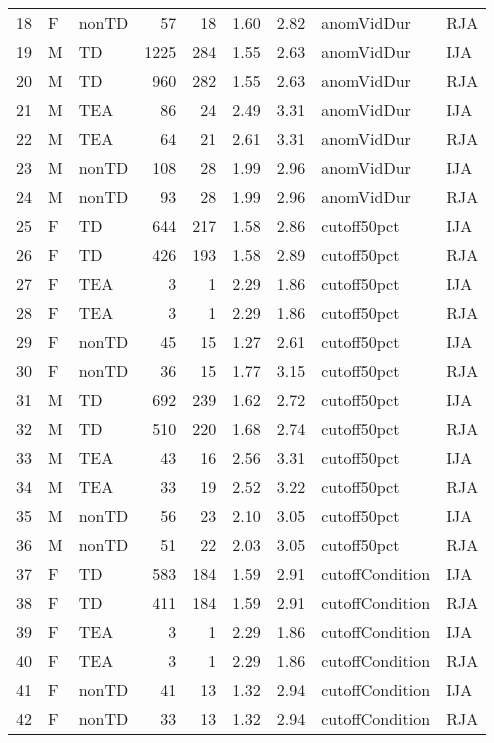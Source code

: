 \documentclass{article}
\begin{document}
\begin{table}[ht]
\begin{tabular}{rllrrrrll}
    18 & F & nonTD &  57 &  18 & 1.60 & 2.82 & anomVidDur & RJA \\ 
    19 & M & TD & 1225 & 284 & 1.55 & 2.63 & anomVidDur & IJA \\ 
    20 & M & TD & 960 & 282 & 1.55 & 2.63 & anomVidDur & RJA \\ 
    21 & M & TEA &  86 &  24 & 2.49 & 3.31 & anomVidDur & IJA \\ 
    22 & M & TEA &  64 &  21 & 2.61 & 3.31 & anomVidDur & RJA \\ 
    23 & M & nonTD & 108 &  28 & 1.99 & 2.96 & anomVidDur & IJA \\ 
    24 & M & nonTD &  93 &  28 & 1.99 & 2.96 & anomVidDur & RJA \\ 
    25 & F & TD & 644 & 217 & 1.58 & 2.86 & cutoff50pct & IJA \\ 
    26 & F & TD & 426 & 193 & 1.58 & 2.89 & cutoff50pct & RJA \\ 
    27 & F & TEA &   3 &   1 & 2.29 & 1.86 & cutoff50pct & IJA \\ 
    28 & F & TEA &   3 &   1 & 2.29 & 1.86 & cutoff50pct & RJA \\ 
    29 & F & nonTD &  45 &  15 & 1.27 & 2.61 & cutoff50pct & IJA \\ 
    30 & F & nonTD &  36 &  15 & 1.77 & 3.15 & cutoff50pct & RJA \\ 
    31 & M & TD & 692 & 239 & 1.62 & 2.72 & cutoff50pct & IJA \\ 
    32 & M & TD & 510 & 220 & 1.68 & 2.74 & cutoff50pct & RJA \\ 
    33 & M & TEA &  43 &  16 & 2.56 & 3.31 & cutoff50pct & IJA \\ 
    34 & M & TEA &  33 &  19 & 2.52 & 3.22 & cutoff50pct & RJA \\ 
    35 & M & nonTD &  56 &  23 & 2.10 & 3.05 & cutoff50pct & IJA \\ 
    36 & M & nonTD &  51 &  22 & 2.03 & 3.05 & cutoff50pct & RJA \\ 
    37 & F & TD & 583 & 184 & 1.59 & 2.91 & cutoffCondition & IJA \\ 
    38 & F & TD & 411 & 184 & 1.59 & 2.91 & cutoffCondition & RJA \\ 
    39 & F & TEA &   3 &   1 & 2.29 & 1.86 & cutoffCondition & IJA \\ 
    40 & F & TEA &   3 &   1 & 2.29 & 1.86 & cutoffCondition & RJA \\ 
    41 & F & nonTD &  41 &  13 & 1.32 & 2.94 & cutoffCondition & IJA \\ 
    42 & F & nonTD &  33 &  13 & 1.32 & 2.94 & cutoffCondition & RJA \\ 

\end{tabular}
\end{table}
\end{document}
